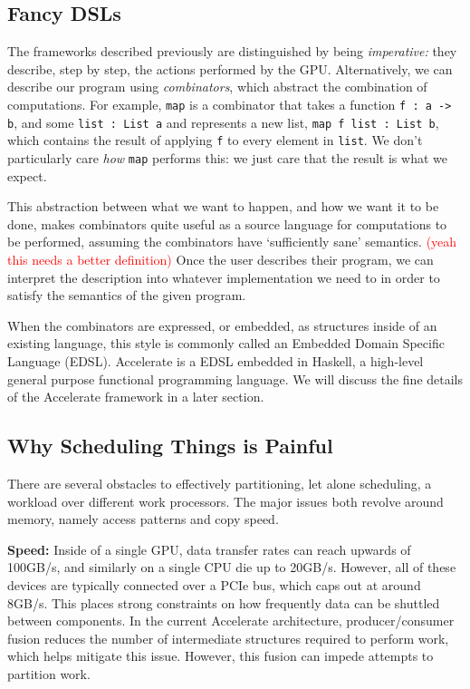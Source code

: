 \documentclass[a4paper,12pt]{article}
\newcommand{\red}[1]{\textcolor{red}{#1}}
\begin{document}
\begin{multicols}{2}
\subsection{Fancy DSLs}

The frameworks described previously are distinguished by being \textit{imperative:} they describe, step by step, the actions performed by the GPU. Alternatively, we can describe our program using \textit{combinators}, which abstract the combination of computations. For example, \texttt{map} is a combinator that takes a function \texttt{f : a -> b}, and some \texttt{list : List a} and represents a new list, \texttt{map f list : List b}, which contains the result of applying \texttt{f} to every element in \texttt{list}. We don't particularly care \textit{how} \texttt{map} performs this: we just care that the result is what we expect.

This abstraction between what we want to happen, and how we want it to be done, makes combinators quite useful as a source language for computations to be performed, assuming the combinators have `sufficiently sane' semantics. \red{(yeah this needs a better definition)} Once the user describes their program, we can interpret the description into whatever implementation we need to in order to satisfy the semantics of the given program.

When the combinators are expressed, or embedded, as structures inside of an existing language, this style is commonly called an Embedded Domain Specific Language (EDSL). Accelerate is a EDSL embedded in Haskell, a high-level general purpose functional programming language. We will discuss the fine details of the Accelerate framework in a later section.

\subsection{Why Scheduling Things is Painful}

There are several obstacles to effectively partitioning, let alone scheduling, a workload over different work processors. The major issues both revolve around memory, namely access patterns and copy speed. 

\textbf{Speed:} Inside of a single GPU, data transfer rates can reach upwards of 100GB/s, and similarly on a single CPU die up to 20GB/s. However, all of these devices are typically connected over a PCIe bus, which caps out at around 8GB/s. This places strong constraints on how frequently data can be shuttled between components. In the current Accelerate architecture, producer/consumer fusion reduces the number of intermediate structures required to perform work, which helps mitigate this issue. However, this fusion can impede attempts to partition work.


\end{multicols}
\end{document}
